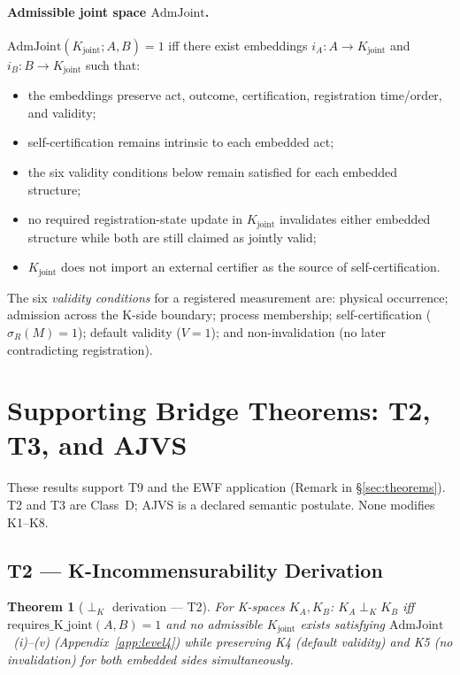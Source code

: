 \documentclass[12pt,a4paper]{article}
\theoremstyle{plain}
\newtheorem{theorem}{Theorem}[section]
\theoremstyle{definition}
\theoremstyle{remark}
\newcommand{\Kjoint}{K_{\mathrm{joint}}}
\begin{document}
\paragraph{Admissible joint space $\mathrm{AdmJoint}$.}
$\mathrm{AdmJoint}(\Kjoint; A, B) = 1$ iff there exist embeddings
$i_A\colon A \to \Kjoint$ and $i_B\colon B \to \Kjoint$ such that:
\begin{itemize}[noitemsep,topsep=2pt]
  \item[(i)]   the embeddings preserve act, outcome, certification,
               registration time/order, and validity;
  \item[(ii)]  self-certification remains intrinsic to each embedded act;
  \item[(iii)] the six validity conditions below remain satisfied for each
               embedded structure;
  \item[(iv)]  no required registration-state update in $\Kjoint$ invalidates
               either embedded structure while both are still claimed as
               jointly valid;
  \item[(v)]   $\Kjoint$ does not import an external certifier as the source of
               self-certification.
\end{itemize}
The six \emph{validity conditions} for a registered measurement are: physical
occurrence; admission across the K-side boundary; process membership;
self-certification ($\sigma_R(M)=1$); default validity ($V=1$); and
non-invalidation (no later contradicting registration).

\section{Supporting Bridge Theorems: T2, T3, and AJVS}
\label{app:bridges}

These results support T9 and the EWF application
(Remark in \S\ref{sec:theorems}). T2 and T3 are Class~D; AJVS is a declared
semantic postulate. None modifies K1--K8.

\subsection{T2 --- K-Incommensurability Derivation}

\begin{theorem}[$\perp_K$ derivation --- T2]\label{thm:T2}
For K-spaces $K_A, K_B$: $K_A \perp_K K_B$ iff
$\mathrm{requires\_K\_joint}(A,B) = 1$ and no admissible $\Kjoint$ exists
satisfying $\mathrm{AdmJoint}$~(i)--(v) (Appendix~\ref{app:level4}) while
preserving K4 (default validity) and K5 (no invalidation) for both embedded
sides simultaneously.
\end{theorem}
\end{document}
